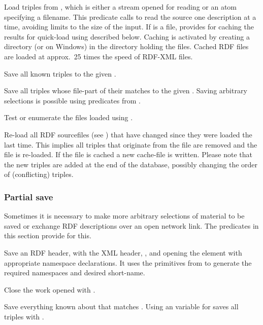 \documentclass[11pt]{article}
\begin{document}
\begin{description}
Load triples from , which is either a stream opened for
reading or an atom specifying a filename.  This predicate calls
 to read the source one description at a time, avoiding
limits to the size of the input.  If  is a file, 
provides for caching the results for quick-load using 
described below.  Caching is activated by creating a directory
 (or  on Windows) in the directory holding
the  files.  Cached RDF files are loaded at approx.\
25 times the speed of RDF-XML files.

Save all known triples to the given .

Save all triples whose file-part of their  matches
\arg{FileRef} to the given \arg{File}.   Saving arbitrary selections
is possible using predicates from \secref{partsave}.

Test or enumerate the files loaded using .

Re-load all RDF sourcefiles (see ) that have changed since
they were loaded the last time.  This implies all triples that originate
from the file are removed and the file is re-loaded.  If the file is
cached a new cache-file is written.  Please note that the new triples
are added at the end of the database, possibly changing the order of
(conflicting) triples.
\end{description}

\subsubsection{Partial save}			\label{sec:partsave}

Sometimes it is necessary to make more arbitrary selections of material
to be saved or exchange RDF descriptions over an open network link. The
predicates in this section provide for this.

\begin{description}
Save an RDF header, with the XML header, ,
 and opening the  element with appropriate
namespace declarations.  It uses the primitives from \secref{rdfns} to
generate the required namespaces and desired short-name.

Close the work opened with .

Save everything known about  that matches .
Using an variable for \arg{FileRef} saves all triples with
\arg{Subject}.
\end{description}
\end{document}
